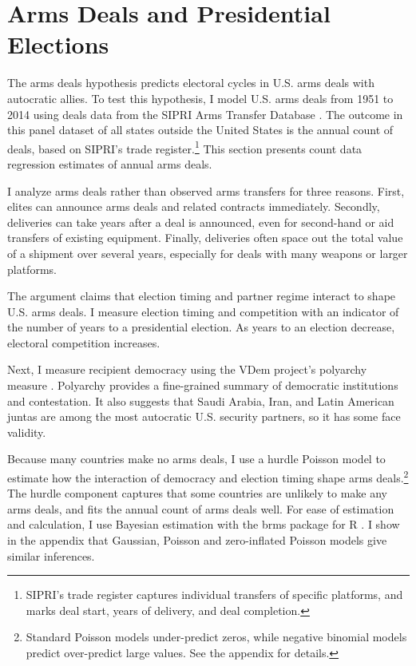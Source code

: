 \documentclass[12pt]{article}
\begin{document}
\section{Arms Deals and Presidential Elections}


The arms deals hypothesis predicts electoral cycles in U.S. arms deals with autocratic allies.
To test this hypothesis, I model U.S. arms deals from 1951 to 2014 using deals data from the SIPRI Arms Transfer Database \citep{SIPRI2021}.
The outcome in this panel dataset of all states outside the United States is the annual count of deals, based on SIPRI's trade register.\footnote{SIPRI's trade register captures individual transfers of specific platforms, and marks deal start, years of delivery, and deal completion.}
This section presents count data regression estimates of annual arms deals. 


I analyze arms deals rather than observed arms transfers for three reasons.
First, elites can announce arms deals and related contracts immediately. 
Secondly, deliveries can take years after a deal is announced, even for second-hand or aid transfers of existing equipment. 
Finally, deliveries often space out the total value of a shipment over several years, especially for deals with many weapons or larger platforms. 


The argument claims that election timing and partner regime interact to shape U.S. arms deals. 
I measure election timing and competition with an indicator of the number of years to a presidential election. 
As years to an election decrease, electoral competition increases. 


Next, I measure recipient democracy using the VDem project's polyarchy measure \citep{Coppedgeetal2008}. 
Polyarchy provides a fine-grained summary of democratic institutions and contestation.
It also suggests that Saudi Arabia, Iran, and Latin American juntas are among the most autocratic U.S. security partners, so it has some face validity.  


Because many countries make no arms deals, I use a hurdle Poisson model to estimate how the interaction of democracy and election timing shape arms deals.\footnote{Standard Poisson models under-predict zeros, while negative binomial models predict over-predict large values. See the appendix for details.} 
The hurdle component captures that some countries are unlikely to make any arms deals, and fits the annual count of arms deals well.
For ease of estimation and calculation, I use Bayesian estimation with the brms package for \textsf{R} \citep{Buerkner2017}. 
I show in the appendix that Gaussian, Poisson and zero-inflated Poisson models give similar inferences. 
\end{document}
